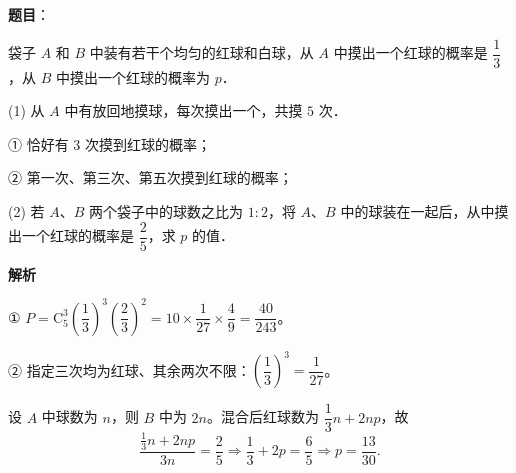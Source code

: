 \begin{answer}

\textbf{题目}：

袋子 $A$ 和 $B$ 中装有若干个均匀的红球和白球，从 $A$ 中摸出一个红球的概率是 $\dfrac{1}{3}$，从 $B$ 中摸出一个红球的概率为 $p$．

(1) 从 $A$ 中有放回地摸球，每次摸出一个，共摸 $5$ 次．

① 恰好有 $3$ 次摸到红球的概率；

② 第一次、第三次、第五次摸到红球的概率；

(2) 若 $A$、$B$ 两个袋子中的球数之比为 $1:2$，将 $A$、$B$ 中的球装在一起后，从中摸出一个红球的概率是 $\dfrac{2}{5}$，求 $p$ 的值．

\textbf{解析}


① $P = \mathrm{C}_5^3\left(\dfrac{1}{3}\right)^3\left(\dfrac{2}{3}\right)^2 = 10 \times \dfrac{1}{27} \times \dfrac{4}{9} = \dfrac{40}{243}$。

② 指定三次均为红球、其余两次不限：$\left(\dfrac{1}{3}\right)^3 = \dfrac{1}{27}$。


设 $A$ 中球数为 $n$，则 $B$ 中为 $2n$。混合后红球数为 $\dfrac{1}{3}n + 2np$，故
\nopagebreak[4]
\[
\frac{\frac{1}{3}n + 2np}{3n} = \frac{2}{5}
\Rightarrow \frac{1}{3} + 2p = \frac{6}{5}
\Rightarrow p = \frac{13}{30}.
\]



\end{answer}
